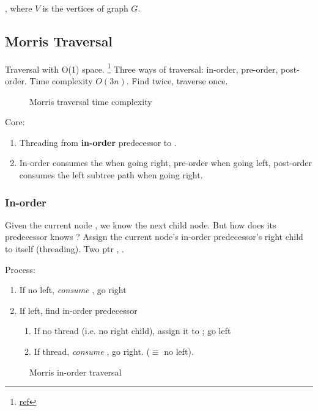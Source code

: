 , where $V$ is the vertices of graph $G$.

\subsection{Morris Traversal} 
Traversal with O(1) space. \footnote{\href{http://www.cnblogs.com/AnnieKim/archive/2013/06/15/MorrisTraversal.html}{ref}}
Three ways of traversal: in-order, pre-order, post-order.
Time complexity $O(3n).$ Find  twice, traverse  once.
\begin{figure}[hbtp]
\centering
{}
\caption{Morris traversal time complexity}
\label{fig:morrisTime}
\end{figure}

Core:
\begin{enumerate}
\item Threading from \textbf{in-order} predecessor to .
\item In-order consumes the  when going right, pre-order when going left, post-order consumes the left subtree path when going right. 
\end{enumerate}
\subsubsection{In-order}
Given the current node , we know the next child node. But how does its predecessor knows ? Assign the current node's in-order predecessor's right child to itself (threading). Two ptr , . 

Process:
\begin{enumerate}
\item If no left, \textit{consume} , go right 
\item If left, find in-order predecessor 
\begin{enumerate}
\item If no thread (i.e. no  right child), assign it to ; go left
\item If thread, \textit{consume} , go right. ($\equiv$ no left). 
\end{enumerate}
\end{enumerate}

\begin{figure*}[!htb]
\centering
{}
\caption{Morris in-order traversal}
\label{fig:morrisInorder}
\end{figure*}

